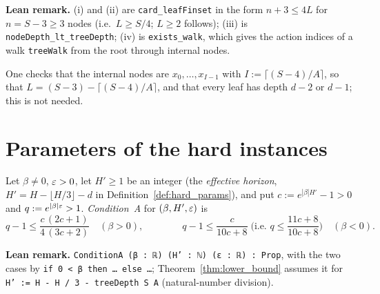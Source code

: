 \textbf{Lean remark.} (i) and (ii) are \texttt{card\_leafFinset} in the form $n + 3 \le 4L$ for $n = S - 3 \ge 3$
nodes (i.e.\ $L \ge S/4$; $L \ge 2$ follows); (iii) is \texttt{nodeDepth\_lt\_treeDepth}; (iv) is
\texttt{exists\_walk}, which gives the action indices of a walk \texttt{treeWalk} from the root through
internal nodes.

One checks that the internal nodes are $x_0, \dots, x_{I-1}$ with $I := \lceil (S-4)/A \rceil$, so that
$L = (S - 3) - \lceil (S-4)/A \rceil$, and that every leaf has depth $d - 2$ or $d - 1$; this is not needed.

\section{Parameters of the hard instances}
\label{sec:lb_params}

\begin{definition}[Condition~A]\label{def:condition_a}
\leanok
Let $\beta \ne 0$, $\varepsilon > 0$, let $H' \ge 1$ be an integer (the \emph{effective horizon},
$H' = H - \lfloor H/3\rfloor - d$ in Definition~\ref{def:hard_params}), and put
$c := e^{|\beta| H'} - 1 > 0$ and $q := e^{|\beta|\varepsilon} > 1$. \emph{Condition~A} for $(\beta, H', \varepsilon)$
is
\[
  q - 1 \le \frac{c\,(2c+1)}{4\,(3c+2)} \quad (\beta > 0), \qquad\qquad
  q - 1 \le \frac{c}{10c + 8} \;\Big(\text{i.e.\ } q \le \frac{11c + 8}{10c + 8}\Big) \quad (\beta < 0).
\]
\end{definition}

\textbf{Lean remark.} \texttt{ConditionA (β : ℝ) (H' : ℕ) (ε : ℝ) : Prop}, with the two
cases by \texttt{if 0 < β then \dots\ else \dots}; Theorem~\ref{thm:lower_bound} assumes it for
\texttt{H' := H - H / 3 - treeDepth S A} (natural-number division).

